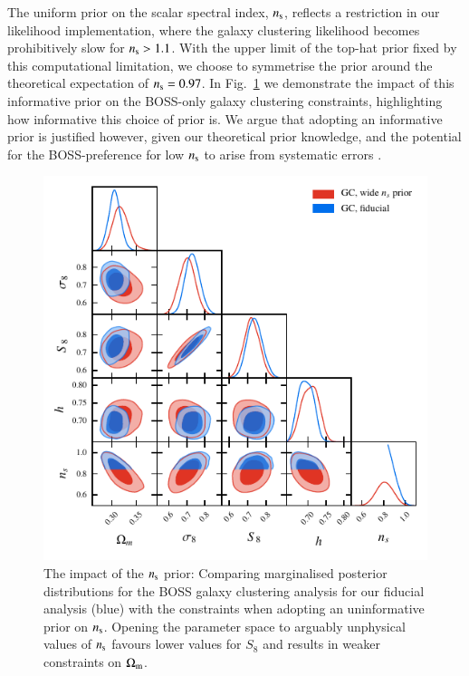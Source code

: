\begin{appendix}
The uniform prior on the scalar spectral index, $n_{\rm s}$, reflects a restriction in our likelihood implementation, where the \citet{sanchez/etal:2017} galaxy clustering likelihood becomes prohibitively slow for $n_{\rm s}>1.1$.  With the upper limit of the top-hat prior fixed by this computational limitation, we choose to symmetrise the prior around the theoretical expectation of $n_{\rm s}=0.97$.     In Fig.~\ref{fig:ns-prior} we demonstrate the impact of this informative prior on the BOSS-only galaxy clustering constraints, highlighting how informative this choice of prior is.   We argue that adopting an informative prior is justified however, given our theoretical prior knowledge, and the potential for the BOSS-preference for low $n_{\rm s}$ to arise from systematic errors \citep{ross/etal:2017}.   

\begin{figure}
	\begin{center}
		\includegraphics[width=\columnwidth]{Parameter_Plots/systematics/GC_ns_prior}
		\caption{The impact of the $n_{\rm s}$ prior: Comparing marginalised posterior distributions for the BOSS galaxy clustering analysis for our fiducial analysis (blue) with the constraints when adopting an uninformative prior on $n_{\rm s}$.   Opening the parameter space to arguably unphysical values of $n_{\rm s}$ favours lower values for $S_8$ and results in weaker constraints on $\Omega_{\rm m}$.}
		\label{fig:ns-prior}
	\end{center}
\end{figure}


\end{appendix}
